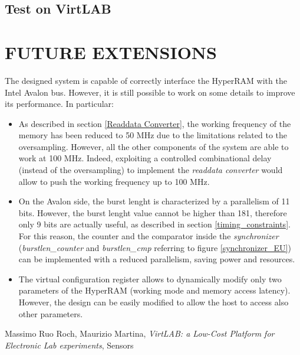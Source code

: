 \documentclass[10pt, english, a4paper, titlepage, oneside]{book}
\begin{document}
\section{Test on VirtLAB}
\chapter{FUTURE EXTENSIONS}
\noindent The designed system is capable of correctly interface the HyperRAM with the Intel Avalon bus. However, it is still possible to work on some details to improve its performance. In particular:
\vspace{2mm}
\begin{itemize}
    \item As described in section \ref{Readdata Converter}, the working frequency of the memory has been reduced to 50 MHz due to the limitations related to the oversampling. However, all the other components of the system are able to work at 100 MHz. Indeed, exploiting a controlled combinational delay (instead of the oversampling) to implement the \textit{readdata converter} would allow to push the working frequency up to 100 MHz.
    \item On the Avalon side, the burst lenght is characterized by a parallelism of 11 bits. However, the burst lenght value cannot be higher than 181, therefore only 9 bits are actually useful, as described in section \ref{timing_constraints}. For this reason, the counter and the comparator inside the \textit{synchronizer} (\textit{burstlen\_counter} and \textit{burstlen\_cmp} referring to figure \ref{synchronizer_EU}) can be implemented with a reduced parallelism, saving power and resources.
    \item The virtual configuration register allows to dynamically modify only two parameters of the HyperRAM (working mode and memory access latency). However, the design can be easily modified to allow the host to access also other parameters.
\end{itemize}


\begin{thebibliography}{1}
     Massimo Ruo Roch, Maurizio Martina, \emph{VirtLAB: a Low-Cost Platform for Electronic Lab experiments}, Sensors
\end{thebibliography}
\end{document}
